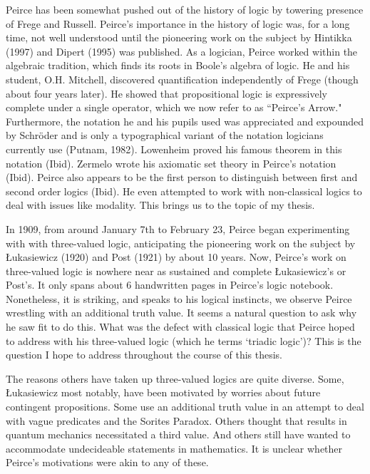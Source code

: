 \documentclass[12pt]{article}
\begin{document}
Peirce has been somewhat pushed out of the history of logic by towering presence of Frege and Russell. Peirce's importance in the history of logic was, for a long time, not well understood until the  pioneering work on the subject by Hintikka (1997) and Dipert (1995) was published. As a logician, Peirce worked within the algebraic tradition, which finds its roots in Boole's algebra of logic. He and his student, O.H. Mitchell, discovered quantification independently of Frege (though about four years later). He showed that propositional logic is expressively complete under a single operator, which we now refer to as ``Peirce's Arrow." Furthermore, the notation he and his pupils used was appreciated and expounded by Schröder and is only a typographical variant of the notation logicians currently use (Putnam, 1982). Lowenheim proved his famous theorem in this notation (Ibid). Zermelo wrote his axiomatic set theory in Peirce's notation (Ibid). Peirce also appears to be the first person to distinguish between first and second order logics (Ibid). He even attempted to work with non-classical logics to deal with issues like modality. This brings us to the topic of my thesis.

In 1909, from around January 7th to February 23, Peirce began experimenting with with three-valued logic, anticipating the pioneering work on the subject by  Łukasiewicz (1920) and Post (1921) by about 10 years. Now, Peirce's work on three-valued logic is nowhere near as sustained and complete Łukasiewicz's or Post's. It only spans about 6 handwritten pages in Peirce's logic notebook. Nonetheless, it is striking, and speaks to his logical instincts, we observe Peirce wrestling with an additional truth value. It seems a natural question to ask why he saw fit to do this. What was the defect with classical logic that Peirce hoped to address with his three-valued logic (which he terms `triadic logic')? This is the question I hope to address throughout the course of this thesis.

The reasons others have taken up three-valued logics are quite diverse. Some, Łukasiewicz most notably, have been motivated by worries about future contingent propositions.  Some use an additional truth value in an attempt to deal with vague predicates and the Sorites Paradox. Others thought that results in quantum mechanics necessitated a third value. And others still have wanted to accommodate undecideable statements in mathematics. It is unclear whether Peirce's motivations were akin to any of these.
\end{document}
